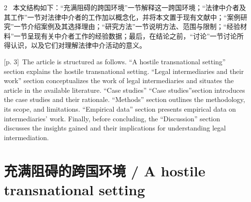 \documentclass[10pt,a4paper]{article}
\begin{document}
\begin{paracol}{2}
\switchcolumn*
{\scriptsize\color{gray} [p. 3]}\ 本文结构如下：“充满阻碍的跨国环境”一节解释这一跨国环境；“法律中介者及其工作”一节对法律中介者的工作加以概念化，并将本文置于现有文献中；“案例研究”一节介绍案例及其选择理由；“研究方法”一节说明方法、范围与限制；“经验材料”一节呈现有关中介者工作的经验数据；最后，在结论之前，“讨论”一节讨论所得认识，以及它们对理解法律中介活动的意义。\par
\switchcolumn
{\scriptsize\color{gray} [p. 3]}\ The article is structured as follows. “A hostile transnational setting” section explains the hostile transnational setting. “Legal intermediaries and their work” section conceptualizes the work of legal intermediaries and situates the article in the available literature. “Case studies” “Case studies”section introduces the case studies and their rationale. “Methods” section outlines the methodology, its scope, and limitations. “Empirical data” section presents empirical data on intermediaries’ work. Finally, before concluding, the “Discussion” section discusses the insights gained and their implications for understanding legal intermediation.\par
\switchcolumn*
\end{paracol}
\section*{充满阻碍的跨国环境 / A hostile transnational setting}
\end{document}

